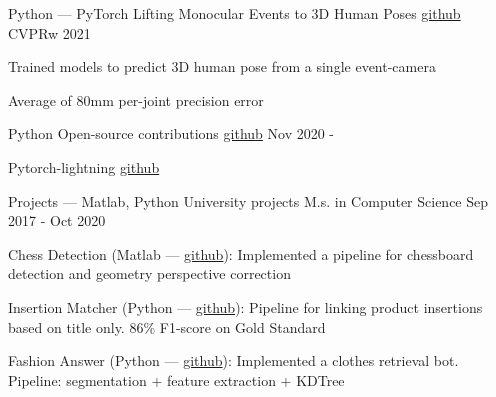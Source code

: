 

\begin{cventries}


  \cventry
  {Python --- PyTorch}
  {Lifting Monocular Events to 3D Human Poses \tiny \href{https://iit-pavis.github.io/lifting_events_to_3d_hpe/}{github}}
  {CVPRw 2021}
  {}
  {
    \begin{cvitems} %
    \item Trained models to predict 3D human pose from a single event-camera
	\item Average of 80mm per-joint precision error 
    \end{cvitems}
  }


  \cventry
  {Python} %
  {Open-source contributions \tiny \href{https://github.com/gianscarpe/bachelor_thesis}{github}} %
  {} %
  {Nov 2020 - } %
  {
    \begin{cvitems} %
    \item Pytorch-lightning \tiny \href{https://github.com/PyTorchLightning/pytorch-lightning}{github}
    \end{cvitems}
  }


  \cventry
  {Projects --- Matlab, Python}
  {University projects}
  {M.s. in Computer Science}
  {Sep 2017 - Oct 2020}
  {
    \begin{cvitems} %
    \item Chess Detection (Matlab --- \href{https://github.com/gianscarpe/chess\_detection}{github}): Implemented a pipeline for chessboard detection and geometry perspective correction
    \item Insertion Matcher (Python --- \href{https://github.com/belerico/insertion-matcher}{github}): Pipeline for linking product insertions based on title only. 86\% F1-score on Gold Standard
    \item Fashion Answer (Python --- \href{https://github.com/gianscarpe/fashion-answer}{github}): Implemented a clothes retrieval bot. Pipeline: segmentation + feature extraction + KDTree    
    \end{cvitems}
  }
\end{cventries}

